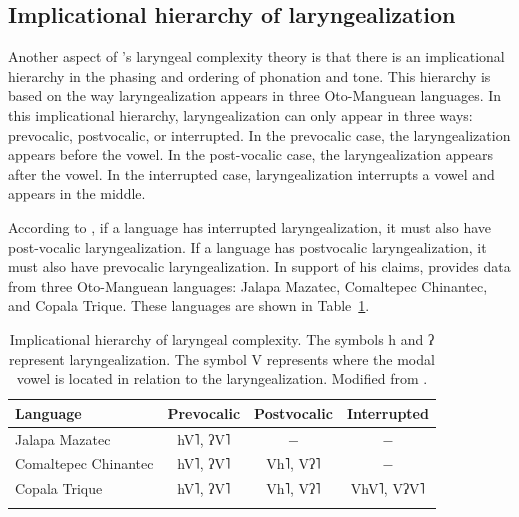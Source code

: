 \subsection{Implicational hierarchy of laryngealization}\label{sec:implicational_hierarchy}

Another aspect of \citeauthor{silvermanLaryngealComplexityOtomanguean1997}'s \citeyear{silvermanLaryngealComplexityOtomanguean1997} laryngeal complexity theory is that there is an implicational hierarchy in the phasing and ordering of phonation and tone. This hierarchy is based on the way laryngealization appears in three Oto-Manguean languages. In this implicational hierarchy, laryngealization can only appear in three ways: prevocalic, postvocalic, or interrupted. In the prevocalic case, the laryngealization appears before the vowel. In the post-vocalic case, the laryngealization appears after the vowel. In the interrupted case, laryngealization interrupts a vowel and appears in the middle.

According to \citet{silvermanLaryngealComplexityOtomanguean1997}, if a language has interrupted laryngealization, it must also have post-vocalic laryngealization. If a language has postvocalic laryngealization, it must also have prevocalic laryngealization. In support of his claims, \citet{silvermanLaryngealComplexityOtomanguean1997} provides data from three Oto-Manguean languages: Jalapa Mazatec, Comaltepec Chinantec, and Copala Trique. These languages are shown in Table~\ref{tab:implicational_hierarchy}.

\begin{table}[h!]
    \centering
    \caption{Implicational hierarchy of laryngeal complexity. The symbols h and ʔ represent laryngealization. The symbol V represents where the modal vowel is located in relation to the laryngealization. Modified from \citet{silvermanLaryngealComplexityOtomanguean1997}.} 
    \label{tab:implicational_hierarchy}
    \begin{tabular}{lccc}
        \lsptoprule
        \textbf{Language} & \textbf{Prevocalic} & \textbf{Postvocalic} & \textbf{Interrupted} \\
        \hline 
        Jalapa Mazatec & hV˥, ʔV˥ & $-$ & $-$ \\
        Comaltepec Chinantec & hV˥, ʔV˥ & Vh˥, Vʔ˥ & $-$ \\
        Copala Trique & hV˥, ʔV˥ & Vh˥, Vʔ˥ & VhV˥, VʔV˥ \\
        \lspbottomrule
    \end{tabular}
\end{table}


